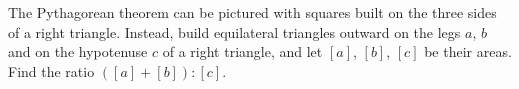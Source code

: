 The Pythagorean theorem can be pictured with squares built on the three sides of a right triangle. Instead, build equilateral triangles outward on the legs $a$, $b$ and on the hypotenuse $c$ of a right triangle, and let $[a]$, $[b]$, $[c]$ be their areas. Find the ratio $\left([a]+[b]\right):[c]$.
